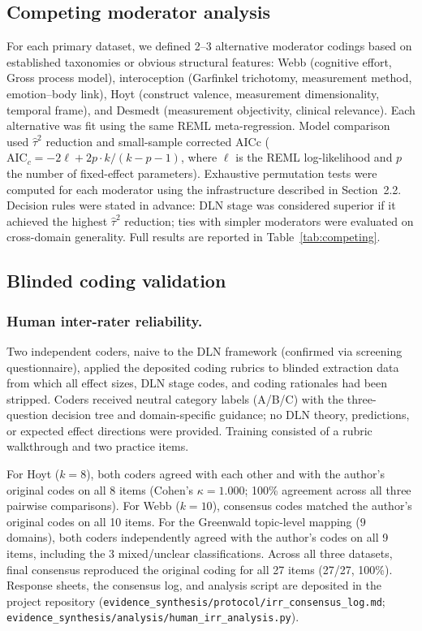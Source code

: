 \documentclass[11pt]{article}
\begin{document}
\subsection{Competing moderator analysis}

For each primary dataset, we defined 2--3 alternative moderator codings
based on established taxonomies or obvious structural features: Webb
(cognitive effort, Gross process model),
interoception (Garfinkel trichotomy, measurement method, emotion--body
link), Hoyt (construct valence, measurement dimensionality, temporal
frame), and Desmedt (measurement objectivity, clinical relevance). Each
alternative was fit using the same REML meta-regression. Model
comparison used $\hat\tau^2$ reduction and small-sample corrected AICc
($\text{AIC}_c = -2\ell + 2p \cdot k/(k-p-1)$, where $\ell$ is the
REML log-likelihood and $p$ the number of fixed-effect parameters).
Exhaustive permutation tests were computed for each moderator using the
infrastructure described in Section~2.2. Decision rules were stated in
advance: DLN stage was considered superior if it achieved the highest
$\hat\tau^2$ reduction; ties with simpler moderators were evaluated on
cross-domain generality. Full results are reported in
Table~\ref{tab:competing}.


\subsection{Blinded coding validation}

\subsubsection*{Human inter-rater reliability.}
Two independent coders, naive to the DLN framework (confirmed via
screening questionnaire), applied the deposited coding rubrics to
blinded extraction data from which all effect sizes, DLN stage codes,
and coding rationales had been stripped. Coders received neutral
category labels (A/B/C) with the three-question decision tree and
domain-specific guidance; no DLN theory, predictions, or expected
effect directions were provided. Training consisted of a rubric
walkthrough and two practice items.

For Hoyt ($k = 8$), both coders agreed with each other and with the
author's original codes on all 8 items (Cohen's $\kappa = 1.000$;
100\% agreement across all three pairwise comparisons). For Webb
($k = 10$), consensus codes matched the author's original codes
on all 10 items. For the Greenwald topic-level mapping ($9$ domains),
both coders independently agreed with the author's codes on all 9
items, including the 3 mixed/unclear classifications. Across all three
datasets, final consensus reproduced the original coding for all 27
items (27/27, 100\%).
Response sheets, the consensus log, and analysis script are deposited
in the project repository
(\texttt{evidence\_synthesis/protocol/irr\_consensus\_log.md};
\texttt{evidence\_synthesis/analysis/human\_irr\_analysis.py}).
\end{document}
